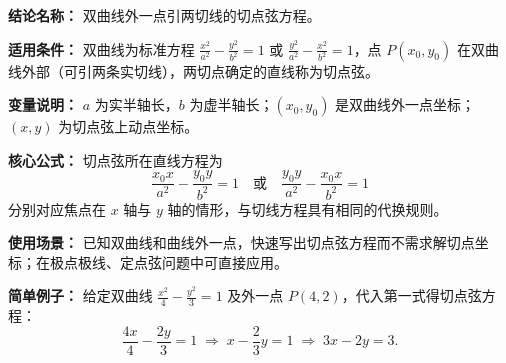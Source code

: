 \textbf{结论名称：} 双曲线外一点引两切线的切点弦方程。

\textbf{适用条件：} 双曲线为标准方程 \(\frac{x^2}{a^2}-\frac{y^2}{b^2}=1\) 或 \(\frac{y^2}{a^2}-\frac{x^2}{b^2}=1\)，点 \(P(x_0,y_0)\) 在双曲线外部（可引两条实切线），两切点确定的直线称为切点弦。

\textbf{变量说明：} \(a\) 为实半轴长，\(b\) 为虚半轴长；\((x_0,y_0)\) 是双曲线外一点坐标；\((x,y)\) 为切点弦上动点坐标。

\textbf{核心公式：} 切点弦所在直线方程为
\[
\boxed{\frac{x_0 x}{a^2} - \frac{y_0 y}{b^2} = 1}
\quad\text{或}\quad
\boxed{\frac{y_0 y}{a^2} - \frac{x_0 x}{b^2} = 1}
\]
分别对应焦点在 \(x\) 轴与 \(y\) 轴的情形，与切线方程具有相同的代换规则。

\textbf{使用场景：} 已知双曲线和曲线外一点，快速写出切点弦方程而不需求解切点坐标；在极点极线、定点弦问题中可直接应用。

\textbf{简单例子：} 给定双曲线 \(\frac{x^2}{4}-\frac{y^2}{3}=1\) 及外一点 \(P(4,2)\)，代入第一式得切点弦方程：
\[
\frac{4x}{4} - \frac{2y}{3} = 1 \;\Longrightarrow\; x - \frac{2}{3}y = 1 \;\Longrightarrow\; 3x - 2y = 3.
\]